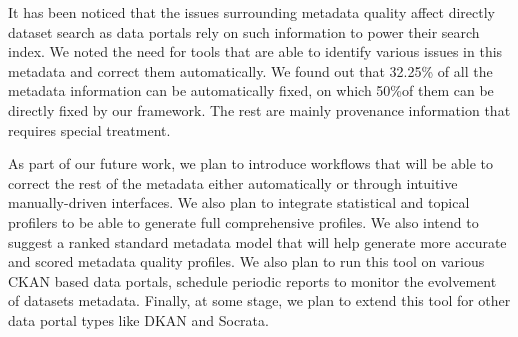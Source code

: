 \documentclass[runningheads,a4paper]{llncs}
\begin{document}
It has been noticed that the issues surrounding metadata quality affect directly dataset search as data portals rely on such information to power their search index. We noted the need for tools that are able to identify various issues in this metadata and correct them automatically. We found out that 32.25\% of all the metadata information can be automatically fixed, on which 50\%of them can be directly fixed by our framework. The rest are mainly provenance information that requires special treatment.

As part of our future work, we plan to introduce workflows that will be able to correct the rest of the metadata either automatically or through intuitive manually-driven interfaces. We also plan to integrate statistical and topical profilers to be able to generate full comprehensive profiles. We also intend to suggest a ranked standard metadata model that will help generate more accurate and scored metadata quality profiles. We also plan to run this tool on various CKAN based data portals, schedule periodic reports to monitor the evolvement of datasets metadata. Finally, at some stage, we plan to extend this tool for other data portal types like DKAN and Socrata.



\nocite{*}

\end{document}
